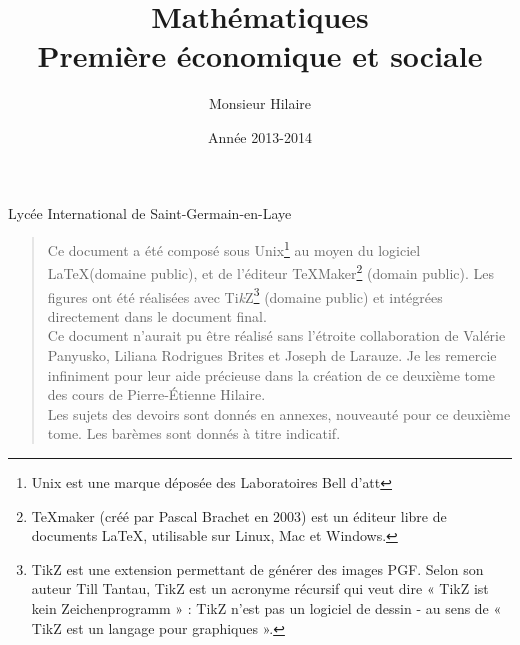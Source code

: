 %

   	 
	
\usepackage[T1]{fontenc} 
\usepackage[a4paper,left=2cm,right=2cm,top=2cm,bottom=2cm]{geometry} 
\usepackage{lmodern} 
\usepackage{graphicx} 
\usepackage{fancyhdr}

\usepackage{textcomp}
\usepackage{texgraph}
\usepackage{pgf,tikz}
\usetikzlibrary{arrows}

\usepackage{variations}


\title {  \Huge     Mathématiques\\
             Première économique et sociale \\
       }

\author{ \Large   Monsieur Hilaire  }

\date  { \large  Année 2013-2014   }





\maketitle\thispagestyle{empty} %
\vfill

\centerline {\large  Lycée International de Saint-Germain-en-Laye} 

\newpage

\thispagestyle{empty}

\def\TikZ{{\fontfamily{cmr}Ti{\em k}Z}} 
    \begin {quote}
    Ce document a été composé sous  Unix\footnote{Unix  est une
    marque déposée des  Laboratoires  Bell d'{\sc att}} au moyen  
    du logiciel \LaTeX (domaine  public),
    et de l'éditeur {\TeX}{Maker}\footnote{TeXmaker (créé par Pascal Brachet en 2003) est un éditeur libre de documents LaTeX, utilisable sur Linux, Mac et Windows.} (domain public). 
    Les figures ont été réalisées avec {\TikZ}\footnote{TikZ est une extension permettant de générer des images PGF. Selon son auteur Till Tantau, TikZ est un acronyme récursif qui veut dire « TikZ ist kein Zeichenprogramm » : TikZ n'est pas un logiciel de dessin - au sens de « TikZ est un langage pour graphiques ».} (domaine
   public)  et  intégrées  directement  dans le  document  final. \\
   
   Ce document n'aurait pu être réalisé sans l'étroite collaboration de Valérie Panyusko, Liliana Rodrigues Brites et Joseph de Larauze. Je les remercie infiniment pour leur aide précieuse dans la création de ce deuxième tome des cours de Pierre-Étienne Hilaire. \\
   
   Les sujets des devoirs sont donnés en annexes, nouveauté pour ce deuxième tome. Les barèmes sont donnés à titre indicatif. \\
   
    \end {quote}

